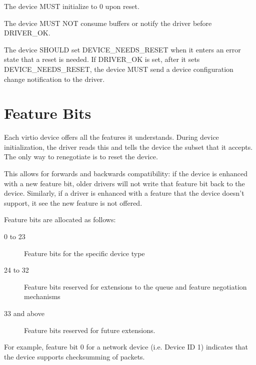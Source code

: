 The device MUST initialize  to 0 upon reset.

The device MUST NOT consume buffers or notify the driver before DRIVER_OK.

\label{sec:Basic Facilities of a Virtio Device / Device Status Field / DEVICENEEDSRESET}The device SHOULD set DEVICE_NEEDS_RESET when it enters an error state
that a reset is needed.  If DRIVER_OK is set, after it sets DEVICE_NEEDS_RESET, the device
MUST send a device configuration change notification to the driver.

\section{Feature Bits}\label{sec:Basic Facilities of a Virtio Device / Feature Bits}

Each virtio device offers all the features it understands.  During
device initialization, the driver reads this and tells the device the
subset that it accepts.  The only way to renegotiate is to reset
the device.

This allows for forwards and backwards compatibility: if the device is
enhanced with a new feature bit, older drivers will not write that
feature bit back to the device.  Similarly, if a driver is enhanced with a feature
that the device doesn't support, it see the new feature is not offered.

Feature bits are allocated as follows:

\begin{description}
\item[0 to 23] Feature bits for the specific device type

\item[24 to 32] Feature bits reserved for extensions to the queue and
  feature negotiation mechanisms

\item[33 and above] Feature bits reserved for future extensions.
\end{description}

\begin{note}
For example, feature bit 0 for a network device (i.e.
Device ID 1) indicates that the device supports checksumming of
packets.
\end{note}

